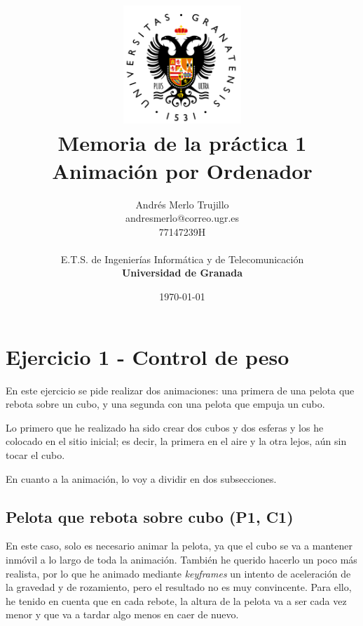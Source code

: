 \documentclass{article}
\title{
\includegraphics[width=1.75in]{imagenes/UGR-Logo.png} \\
\vspace*{1in}
\textbf{Memoria de la práctica 1} \\
Animación por Ordenador \\
\vspace*{0.5in}}
\author{Andrés Merlo Trujillo \\
andresmerlo@correo.ugr.es \\
77147239H \\ 
\vspace*{0.5in} \\
E.T.S. de Ingenierías Informática y de Telecomunicación \\
\textbf{Universidad de Granada}} \date{\today}
\begin{document}
\begin{titlingpage}
\maketitle
\end{titlingpage}

\tableofcontents

\newpage

\pagestyle{fancy}   %

\section{Ejercicio 1 - Control de peso}

En este ejercicio se pide realizar dos animaciones: una primera de una pelota que rebota sobre un cubo, y una segunda con una pelota que empuja un cubo.

\bigskip


Lo primero que he realizado ha sido crear dos cubos y dos esferas y los he colocado en el sitio inicial; es decir, la primera en el aire y la otra lejos, aún sin tocar el cubo.


En cuanto a la animación, lo voy a dividir en dos subsecciones.

\subsection{Pelota que rebota sobre cubo (P1, C1)}

En este caso, solo es necesario animar la pelota, ya que el cubo se va a mantener inmóvil a lo largo de toda la animación. También he querido hacerlo un poco más realista, por lo que he animado mediante \textit{keyframes} un intento de aceleración de la gravedad y de rozamiento, pero el resultado no es muy convincente. Para ello, he tenido en cuenta que en cada rebote, la altura de la pelota va a ser cada vez menor y que va a tardar algo menos en caer de nuevo. 
\end{document}
